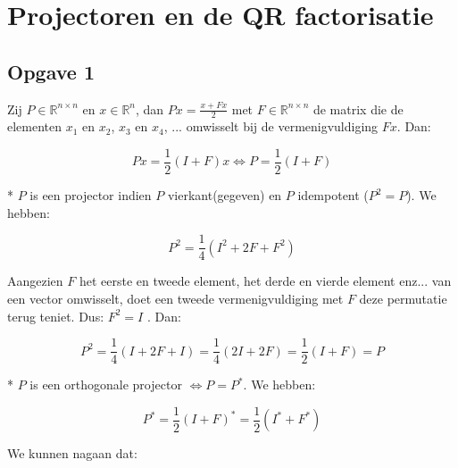 \documentclass[een]{practicumverslag}
\begin{document}
         
\maketitlepage


\pagebreak

\section{Projectoren en de QR factorisatie}

\subsection*{Opgave 1}

Zij $P \in \mathbb{R}^{n \times n} $ en $x \in \mathbb{R}^{n}$, dan $Px = \frac{x + Fx}{2}$ met $F \in \mathbb{R}^{n \times n}$ de matrix die de elementen $x_1$ en $x_2$, $x_3$ en $x_4$, ... omwisselt bij de vermenigvuldiging $Fx.$
Dan:

\begin{equation}
	Px = \frac{1}{2}(I + F)x \Leftrightarrow P = \frac{1}{2}(I+F)
\end{equation}
	
* $P$ is een projector indien $P$ vierkant(gegeven) en $P$ idempotent ($P^2 = P$).
We hebben:

\begin{equation}
	P^2 = \frac{1}{4}(I^2 + 2F + F^2)
\end{equation}

Aangezien $F$ het eerste en tweede element, het derde en vierde element enz... van een vector omwisselt, doet een tweede vermenigvuldiging met $F$ deze permutatie terug teniet. 
Dus: $F^2 = I$ . Dan:

\begin{equation}
	P^2 = \frac{1}{4}(I + 2F + I) = \frac{1}{4}(2I + 2F) = \frac{1}{2}(I + F) = P
\end{equation}

* $P$ is een orthogonale projector $\Leftrightarrow P = P^{*}$.
We hebben:

\begin{equation}
	P^* = \frac{1}{2}(I + F)^* = \frac{1}{2}(I^* + F^*)
\end{equation}

We kunnen nagaan dat:
\end{document}
